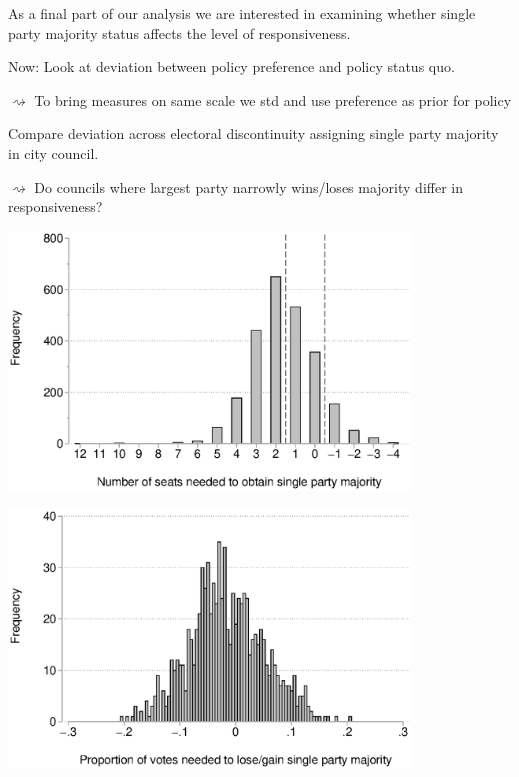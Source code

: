 \documentclass[10pt,aspectratio=169]{beamer}
\begin{document}
\begin{frame}			
As a final part of our analysis we are interested in examining whether single party majority status affects the level of responsiveness. 

\vspace{0.2in} \pause
Now: Look at deviation between policy preference and policy status quo.

$\rightsquigarrow$ To bring measures on same scale we std and use preference as prior for policy

\vspace{0.2in} \pause

Compare deviation across electoral discontinuity assigning single party majority in city council.

$\rightsquigarrow$ Do councils where largest party narrowly wins/loses majority differ in responsiveness?


\end{frame}

\begin{frame}		
\centering	
	\includegraphics[width=0.8\textwidth]{images/closeelec.eps}
\end{frame}

\begin{frame}
\centering			
\includegraphics[width=0.8\textwidth]{images/distpct.eps}
\end{frame}
\end{document}
